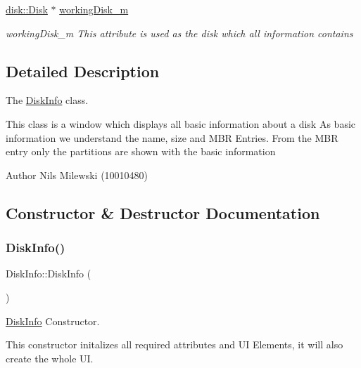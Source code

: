 \begin{DoxyCompactItemize}
\mbox{\label{class_disk_info_a955c186e1e1949712bf4e8e8c504b340}} 
\mbox{\hyperlink{classdisk_1_1_disk}{disk\+::\+Disk}} $\ast$ \mbox{\hyperlink{class_disk_info_a955c186e1e1949712bf4e8e8c504b340}{working\+Disk\+\_\+m}}
\begin{DoxyCompactList}\small\item\em working\+Disk\+\_\+m This attribute is used as the disk which all information contains \end{DoxyCompactList}\end{DoxyCompactItemize}


\subsection{Detailed Description}
The \mbox{\hyperlink{class_disk_info}{Disk\+Info}} class. 

This class is a window which displays all basic information about a disk As basic information we understand the name, size and M\+BR Entries. From the M\+BR entry only the partitions are shown with the basic information \begin{DoxyAuthor}{Author}
Nils Milewski (10010480) 
\end{DoxyAuthor}


\subsection{Constructor \& Destructor Documentation}
\mbox{\label{class_disk_info_aca4cde2e854e44f42f3edb8c9bba47ea}} 
\subsubsection{\texorpdfstring{Disk\+Info()}{DiskInfo()}}
{\footnotesize\ttfamily Disk\+Info\+::\+Disk\+Info (\begin{DoxyParamCaption}{ }\end{DoxyParamCaption})}



\mbox{\hyperlink{class_disk_info}{Disk\+Info}} Constructor. 

This constructor initalizes all required attributes and UI Elements, it will also create the whole UI. \mbox{\label{class_disk_info_a8a4c3385e2661ba6dc614d00f8dec9d9}} 

